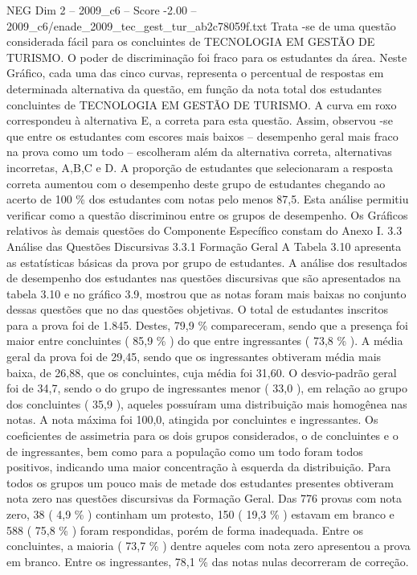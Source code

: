 \begin{textsample}{NEG Dim 2 – 2009\_c6 – Score -2.00 – 2009\_c6/enade\_2009\_tec\_gest\_tur\_ab2c78059f.txt}
Trata -se de uma questão considerada fácil para os concluintes de TECNOLOGIA EM GESTÃO DE TURISMO.
O poder de discriminação foi fraco para os estudantes da área.
Neste Gráfico, cada uma das cinco curvas, representa o percentual de respostas em determinada alternativa da questão, em função da nota total dos estudantes concluintes de TECNOLOGIA EM GESTÃO DE TURISMO.
A curva em roxo correspondeu à alternativa E, a correta para esta questão.
Assim, observou -se que entre os estudantes com escores mais baixos – desempenho geral mais fraco na prova como um todo – escolheram além da alternativa correta, alternativas incorretas, A,B,C e D.
A proporção de estudantes que selecionaram a resposta correta aumentou com o desempenho deste grupo de estudantes chegando ao acerto de 100 \% dos estudantes com notas pelo menos 87,5.
Esta análise permitiu verificar como a questão discriminou entre os grupos de desempenho.
Os Gráficos relativos às demais questões do Componente Específico constam do Anexo I. 3.3 Análise das Questões Discursivas 3.3.1 Formação Geral A Tabela 3.10 apresenta as estatísticas básicas da prova por grupo de estudantes.
A análise dos resultados de desempenho dos estudantes nas questões discursivas que são apresentados na tabela 3.10 e no gráfico 3.9, mostrou que as notas foram mais baixas no conjunto dessas questões que no das questões objetivas.
O total de estudantes inscritos para a prova foi de 1.845.
Destes, 79,9 \% compareceram, sendo que a presença foi maior entre concluintes ( 85,9 \% ) do que entre ingressantes ( 73,8 \% ).
A média geral da prova foi de 29,45, sendo que os ingressantes obtiveram média mais baixa, de 26,88, que os concluintes, cuja média foi 31,60.
O desvio-padrão geral foi de 34,7, sendo o do grupo de ingressantes menor ( 33,0 ), em relação ao grupo dos concluintes ( 35,9 ), aqueles possuíram uma distribuição mais homogênea nas notas.
A nota máxima foi 100,0, atingida por concluintes e ingressantes.
Os coeficientes de assimetria para os dois grupos considerados, o de concluintes e o de ingressantes, bem como para a população como um todo foram todos positivos, indicando uma maior concentração à esquerda da distribuição.
Para todos os grupos um pouco mais de metade dos estudantes presentes obtiveram nota zero nas questões discursivas da Formação Geral.
Das 776 provas com nota zero, 38 ( 4,9 \% ) continham um protesto, 150 ( 19,3 \% ) estavam em branco e 588 ( 75,8 \% ) foram respondidas, porém de forma inadequada.
Entre os concluintes, a maioria ( 73,7 \% ) dentre aqueles com nota zero apresentou a prova em branco.
Entre os ingressantes, 78,1 \% das notas nulas decorreram de correção.

\end{textsample}
